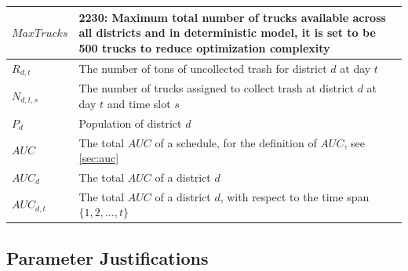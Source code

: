 \documentclass{article}
\begin{document}
\begin{table}[h]
\begin{tabular}{|p{}|p{}|}
\hline
$MaxTrucks$ & 2230: Maximum total number of trucks available across all districts and in deterministic model, it is set to be 500 trucks to reduce optimization complexity\\
\hline
$R_{d, t}$ & The number of tons of uncollected trash for district $d$ at day $t$ \\
\hline
$N_{d, t, s}$ & The number of trucks assigned to collect trash at district $d$ at day $t$ and time slot $s$\\
\hline
$P_{d}$ &  Population of district $d$\\
\hline
$AUC$ & The total $AUC$ of a schedule, for the definition of $AUC$, see \cref{sec:auc}\\
\hline
$AUC_d$ & The total $AUC$ of a district $d$\\
\hline
$AUC_{d,t}$ & The total $AUC$ of a district $d$, with respect to the time span $\{ 1, 2, ..., t \}$\\
\hline
\end{tabular}
\end{table}

\subsection{Parameter Justifications}
\end{document}
